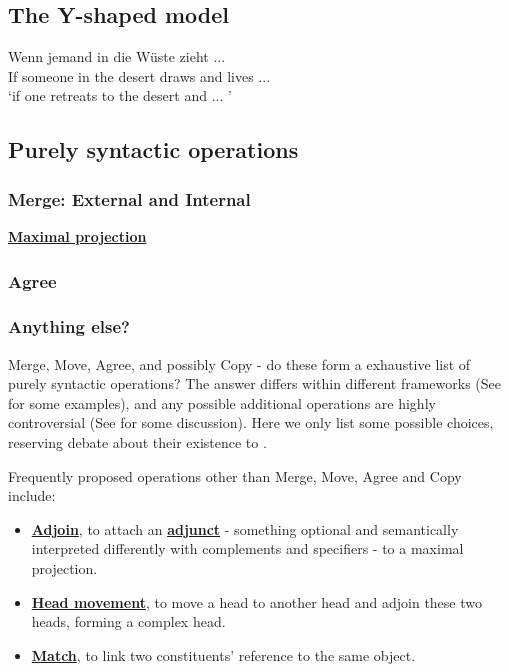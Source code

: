 \documentclass[a4paper]{article}
\newcommand*{\concept}[1]{\underline{\textbf{#1}}}
\begin{document}
\subsection{The Y-shaped model}

\begin{exe}
    \ex
    \gll Wenn jemand in die W\"uste zieht ... \\
    If someone in the desert draws and lives ... \\
    \trans `if one retreats to the desert and ... '
\end{exe}

\subsection{Purely syntactic operations}

\subsubsection{Merge: External and Internal}

\concept{Maximal projection}

\subsubsection{Agree}


\subsubsection{Anything else?}

Merge, Move, Agree, and possibly Copy - do these form a exhaustive list of purely syntactic operations? 
The answer differs within different frameworks (See  for some examples), and any possible additional operations are highly controversial (See  for some discussion).
Here we only list some possible choices, reserving debate about their existence to .

Frequently proposed operations other than Merge, Move, Agree and Copy include:

\begin{itemize}
    \item \concept{Adjoin}, to attach an \concept{adjunct} - something optional and semantically interpreted differently with complements and specifiers - to a maximal projection. 
    \item \concept{Head movement}, to move a head to another head and adjoin these two heads, forming a complex head.
    \item \concept{Match}, to link two constituents' reference to the same object.
\end{itemize}
\end{document}
